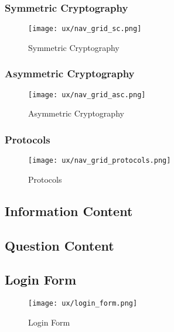 \subsubsection{Symmetric Cryptography}
\begin{figure}[H]
\begin{center}
\texttt{[image: ux/nav\_grid\_sc.png]}
\end{center} 
\caption{Symmetric Cryptography}
\label{ux_sc}
\end{figure}

\subsubsection{Asymmetric Cryptography}
\begin{figure}[H]
\begin{center}
\texttt{[image: ux/nav\_grid\_asc.png]}
\end{center} 
\caption{Asymmetric Cryptography}
\label{ux_asc}
\end{figure}

\subsubsection{Protocols}
\begin{figure}[H]
\begin{center}
\texttt{[image: ux/nav\_grid\_protocols.png]}
\end{center} 
\caption{Protocols}
\label{ux_protocol}
\end{figure}

\subsection{Information Content}

\subsection{Question Content}

\subsection{Login Form}

\begin{figure}[H]
\begin{center}
\texttt{[image: ux/login\_form.png]}
\end{center}
\hspace{-2cm} 
\caption{Login Form}
\label{ux_login_form}
\end{figure}


